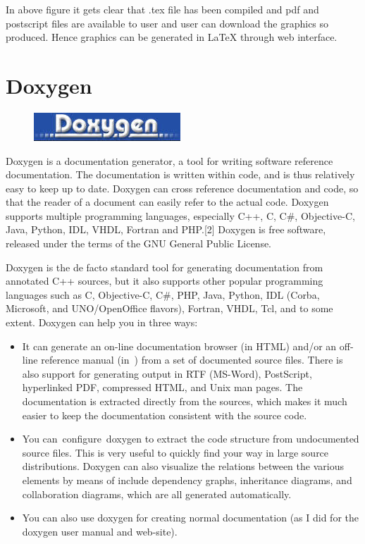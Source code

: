 \noindent In above figure it gets clear that .tex file has been compiled and pdf and postscript files
are available to user and user can download the graphics so produced. Hence graphics
can be generated in \LaTeX{} through web interface.

\section{Doxygen}
\begin{figure}[h]
	\centering \includegraphics[scale=1]{images/doxygen.jpg}
\end{figure}
Doxygen is a documentation generator, a tool for writing software reference documentation. The documentation is written within code, and is thus relatively easy to keep up to date. Doxygen can cross reference documentation and code, so that the reader of a document can easily refer to the actual code.
Doxygen supports multiple programming languages, especially C++, C, C\#, Objective-C, Java, Python, IDL, VHDL, Fortran and PHP.[2] Doxygen is free software, released under the terms of the GNU General Public License.

Doxygen is the de facto standard tool for generating documentation from annotated C++ sources, but it also supports other popular programming languages such as C, Objective-C, C\#, PHP, Java, Python, IDL (Corba, Microsoft, and UNO/OpenOffice flavors), Fortran, VHDL, Tcl, and to some extent.
Doxygen can help you in three ways:

\begin{itemize}
	\item It can generate an on-line documentation browser (in HTML) and/or an off-line reference manual (in ) from a set of documented source files. There is also support for generating output in RTF (MS-Word), PostScript, hyperlinked PDF, compressed HTML, and Unix man pages. The documentation is extracted directly from the sources, which makes it much easier to keep the documentation consistent with the source code.
	\item You can configure doxygen to extract the code structure from undocumented source files. This is very useful to quickly find your way in large source distributions. Doxygen can also visualize the relations between the various elements by means of include dependency graphs, inheritance diagrams, and collaboration diagrams, which are all generated automatically.
	\item You can also use doxygen for creating normal documentation (as I did for the doxygen user manual and web-site).
\end{itemize}

